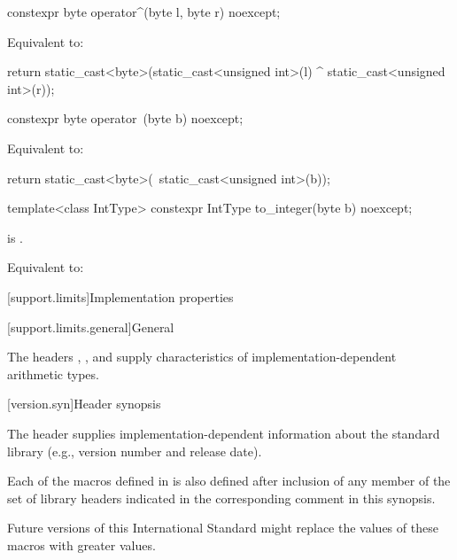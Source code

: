 %
\begin{itemdecl}
constexpr byte operator^(byte l, byte r) noexcept;
\end{itemdecl}

\begin{itemdescr}
\pnum
\effects
Equivalent to:
\begin{codeblock}
return static_cast<byte>(static_cast<unsigned int>(l) ^ static_cast<unsigned int>(r));
\end{codeblock}
\end{itemdescr}

%
\begin{itemdecl}
constexpr byte operator~(byte b) noexcept;
\end{itemdecl}

\begin{itemdescr}
\pnum
\effects
Equivalent to:
\begin{codeblock}
return static_cast<byte>(~static_cast<unsigned int>(b));
\end{codeblock}
\end{itemdescr}

%
\begin{itemdecl}
template<class IntType>
  constexpr IntType to_integer(byte b) noexcept;
\end{itemdecl}

\begin{itemdescr}
\pnum
\constraints
{} is .

\pnum
\effects
Equivalent to: 
\end{itemdescr}

[support.limits]{Implementation properties}

[support.limits.general]{General}

\pnum
The headers
,
, and
supply characteristics of
%
imple\-mentation-dependent
arithmetic types.

[version.syn]{Header  synopsis}

\pnum
The header 
supplies implementation-dependent information
about the \Cpp{} standard library
(e.g., version number and release date).

\pnum
Each of the macros defined in  is also defined
after inclusion of any member of the set of library headers
indicated in the corresponding comment in this synopsis.
\begin{note}
Future versions of this International Standard might replace
the values of these macros with greater values.
\end{note}

